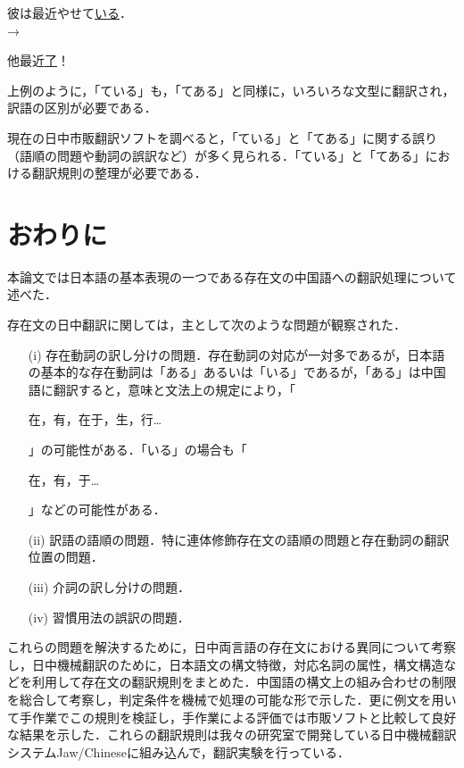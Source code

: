 \documentclass[japanese]{jnlp_1.4}
\newcommand{\inHRei}[1]{}
\begin{document}
\inHRei{(21)}
彼は最近やせて\ul{いる}．\\
→\begin{簡体中文}他最近\ul{了}！\end{簡体中文}

上例のように，「ている」も，「てある」と同様に，いろいろな文型に翻訳され，訳語の区別が必要である．

現在の日中市販翻訳ソフトを調べると，「ている」と「てある」に関する誤り（語順の問題や動詞の誤訳など）が多く見られる．「ている」と「てある」における翻訳規則の整理が必要である．



\section{おわりに}

本論文では日本語の基本表現の一つである存在文の中国語への翻訳処理について述べた．

存在文の日中翻訳に関しては，主として次のような問題が観察された．

\begin{itemize}
\item[(i)]
存在動詞の訳し分けの問題．存在動詞の対応が一対多であるが，日本語の基本的な存在動詞は「ある」あるいは「いる」であるが，「ある」は中国語に翻訳すると，意味と文法上の規定により，「\begin{簡体中文}在，有，在于，生，行…\end{簡体中文}」の可能性がある．「いる」の場合も「\begin{簡体中文}在，有，于…\end{簡体中文}」などの可能性がある．

\item[(ii)]
訳語の語順の問題．特に連体修飾存在文の語順の問題と存在動詞の翻訳位置の問題．

\item[(iii)]
介詞の訳し分けの問題．

\item[(iv)]
習慣用法の誤訳の問題．
\end{itemize}

これらの問題を解決するために，日中両言語の存在文における異同について考察し，日中機械翻訳のために，日本語文の構文特徴，対応名詞の属性，構文構造などを利用して存在文の翻訳規則をまとめた．中国語の構文上の組み合わせの制限を総合して考察し，判定条件を機械で処理の可能な形で示した．更に例文を用いて手作業でこの規則を検証し，手作業による評価では市販ソフトと比較して良好な結果を示した．これらの翻訳規則は我々の研究室で開発している日中機械翻訳システムJaw/Chineseに組み込んで，翻訳実験を行っている．
\end{document}
